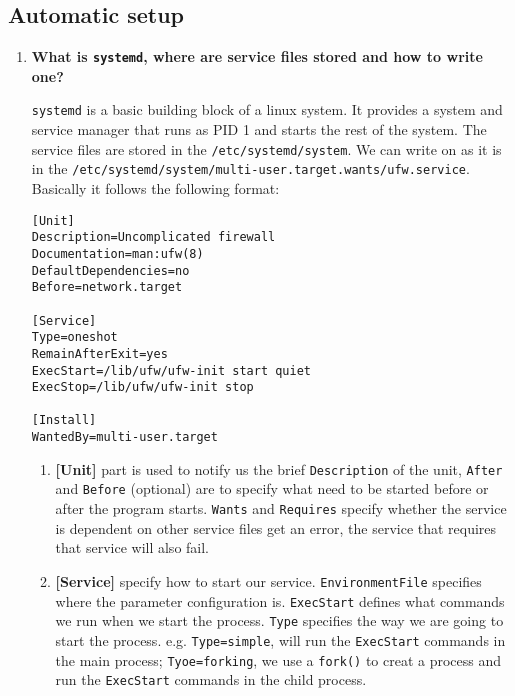 \documentclass[12pt,a4paper]{article}
\theoremstyle{definition}
\begin{document}
\subsection{Automatic setup}
\begin{enumerate}
	\item \textbf{What is \texttt{systemd}, where are service files stored and how to write one?}
	
	\texttt{systemd} is a basic building block of a linux system. It provides a system and service manager that runs as PID 1 and starts the rest of the system. The service files are stored in the \texttt{/etc/systemd/system}. We can write on as it is in the \texttt{/etc/systemd/system/multi-user.target.wants/ufw.service}. Basically it follows the following format:
	
\begin{verbatim}
[Unit]
Description=Uncomplicated firewall
Documentation=man:ufw(8)
DefaultDependencies=no
Before=network.target

[Service]
Type=oneshot
RemainAfterExit=yes
ExecStart=/lib/ufw/ufw-init start quiet
ExecStop=/lib/ufw/ufw-init stop

[Install]
WantedBy=multi-user.target
\end{verbatim}
	
	\begin{enumerate}
		\item \textbf{[Unit]} part is used to notify us the brief \texttt{Description} of the unit, \texttt{After} and \texttt{Before} (optional) are to specify what need to be started before or after the program starts. \texttt{Wants} and \texttt{Requires} specify whether the service is dependent on other service files get an error, the service that requires that service will also fail.
		
		\item \textbf{[Service]} specify how to start our service. \texttt{EnvironmentFile} specifies where the parameter configuration is. \texttt{ExecStart} defines what commands we run when we start the process. \texttt{Type} specifies the way we are going to start the process. e.g. \texttt{Type=simple}, will run the \texttt{ExecStart} commands in the main process; \texttt{Tyoe=forking}, we use a \texttt{fork()} to creat a process and run the \texttt{ExecStart} commands in the child process.
		

\end{enumerate}
\end{enumerate}
\end{document}
